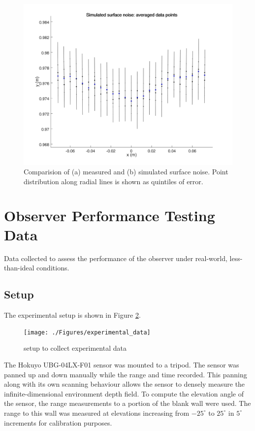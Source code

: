 \begin{figure}
{\begin{minipage}[b]{0.45\columnwidth}
    			\includegraphics[width=1\textwidth,trim = 0mm 0mm 0mm 0mm,clip]{./Figures/simulated_surface_noise}\vspace*{0ex}
 			\end{minipage}}
	  		\caption{Comparision of (a) measured and (b) simulated surface noise. Point distribution along radial lines is shown as quintiles of error.}
	  		\label{fig:surface_noise}
		\end{figure}

\section{Observer Performance Testing Data} \label{testingdata}
	Data collected to assess the performance of the observer under real-world, less-than-ideal conditions.
	\subsection{Setup}
		The experimental setup is shown in Figure \ref{fig:experimental_data}.
		\begin{figure}
		\centering
			 	\texttt{[image: ./Figures/experimental\_data]}\vspace*{0ex}
			  	\caption{setup to collect experimental data} \label{fig:experimental_data}
		\end{figure}

		The Hokuyo UBG-04LX-F01 sensor was mounted to a tripod. The sensor was panned up and down manually while the range and time recorded. This panning along with its own scanning behaviour allows the sensor to densely measure the infinite-dimensional environment depth field. To compute the elevation angle of the sensor, the range measurements to a portion of the blank wall were used. The range to this wall was measured at elevations increasing from  $-25^\circ$ to $25^\circ$ in $5^\circ$ increments for calibration purposes.
		
